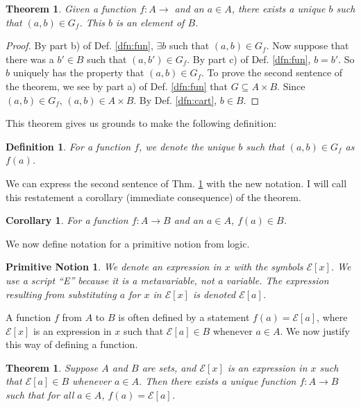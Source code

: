 \documentclass[12pt]{article}
\newcounter{prmc}
\newcounter{dfnc}
\newcounter{thmc}
\newtheorem{prm}[prmc]{Primitive Notion}
\newtheorem{dfn}[dfnc]{Definition}
\newtheorem{thm}[thmc]{Theorem}
\newtheorem{cor}[thmc]{Corollary}
\begin{document}
\begin{thm}\label{thm:eval}
  Given a function $f:A\rightarrow$ and an $a\in A$, there exists a
  unique $b$ such that $(a,b)\in G_f$.  This $b$ is an element of $B$.
\end{thm}

\begin{proof}
  By part b) of Def. \ref{dfn:fun}, $\exists b$ such that $(a,b)\in
  G_f$.  Now suppose that there was a $b'\in B$ such that $(a,b')\in
  G_f$.  By part c) of Def. \ref{dfn:fun}, $b=b'$.  So $b$ uniquely
  has the property that $(a,b)\in G_f$.  To prove the second sentence
  of the theorem, we see by part a) of Def. \ref{dfn:fun} that
  $G\subseteq A\times B$.  Since $(a,b)\in G_f$, $(a,b)\in A\times B$.
  By Def. \ref{dfn:cart}, $b\in B$.
\end{proof}

This theorem gives us grounds to make the following definition:

\begin{dfn}
  For a function $f$, we denote the unique $b$ such that $(a,b)\in
  G_f$ as $f(a)$.
\end{dfn}

We can express the second sentence of Thm. \ref{thm:eval} with the new
notation.  I will call this restatement a corollary (immediate
consequence) of the theorem.

\begin{cor}
  For a function $f:A\rightarrow B$ and an $a\in A$, $f(a)\in B$.
\end{cor}

We now define notation for a primitive notion from logic.

\begin{prm}
  We denote an expression in $x$ with the symbols $\mathcal{E}[x]$.
  We use a script ``E'' because it is a metavariable, not a variable.
  The expression resulting from substituting $a$ for $x$ in
  $\mathcal{E}[x]$ is denoted $\mathcal{E}[a]$.
\end{prm}

A function $f$ from $A$ to $B$ is often defined by a statement
$f(a)=\mathcal{E}[a]$, where $\mathcal{E}[x]$ is an expression in $x$
such that $\mathcal{E}[a]\in B$ whenever $a\in A$.  We now justify
this way of defining a function.

\begin{thm}\label{thm:fundef}
  Suppose $A$ and $B$ are sets, and $\mathcal{E}[x]$ is an expression
  in $x$ such that $\mathcal{E}[a]\in B$ whenever $a\in A$.  Then
  there exists a unique function $f:A\rightarrow B$ such that for all
  $a\in A$, $f(a)=\mathcal{E}[a]$.
\end{thm}
\end{document}
